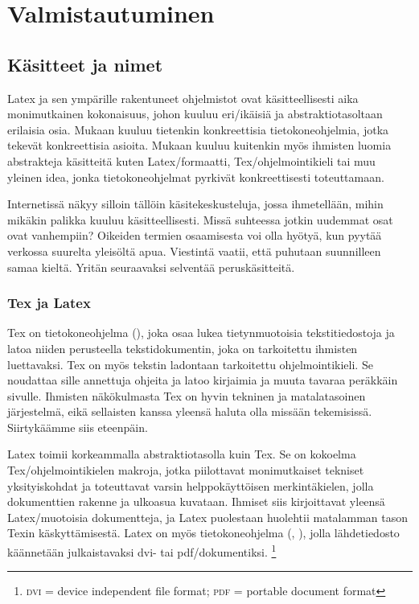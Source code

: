 \chapter{Valmistautuminen}

\section{Käsitteet ja nimet}

Latex ja sen ympärille rakentuneet ohjelmistot ovat käsitteellisesti
aika monimutkainen kokonaisuus, johon kuuluu eri\-/ikäisiä ja
abstraktiotasoltaan erilaisia osia. Mukaan kuuluu tietenkin
konkreettisia tietokoneohjelmia, jotka tekevät konkreettisia asioita.
Mukaan kuuluu kuitenkin myös ihmisten luomia abstrakteja käsitteitä
kuten Latex\-/formaatti, Tex\-/ohjelmointikieli tai muu yleinen idea,
jonka tietokoneohjelmat pyrkivät konkreettisesti toteuttamaan.

Internetissä näkyy silloin tällöin käsitekeskusteluja, jossa
ihmetellään, mihin mikäkin palikka kuuluu käsitteellisesti. Missä
suhteessa jotkin uudemmat osat ovat vanhempiin? Oikeiden termien
osaamisesta voi olla hyötyä, kun pyytää verkossa suurelta yleisöltä
apua. Viestintä vaatii, että puhutaan suunnilleen samaa kieltä. Yritän
seuraavaksi selventää peruskäsitteitä.

\subsection{Tex ja Latex}

Tex on tietokoneohjelma (), joka osaa lukea tietynmuotoisia
tekstitiedostoja ja latoa niiden perusteella tekstidokumentin, joka on
tarkoitettu ihmisten luettavaksi. Tex on myös tekstin ladontaan
tarkoitettu ohjelmointikieli. Se noudattaa sille annettuja ohjeita ja
latoo kirjaimia ja muuta tavaraa peräkkäin sivulle. Ihmisten
näkökulmasta Tex on hyvin tekninen ja matalatasoinen järjestelmä, eikä
sellaisten kanssa yleensä haluta olla missään tekemisissä. Siirtykäämme
siis eteenpäin.

Latex toimii korkeammalla abstraktiotasolla kuin Tex. Se on kokoelma
Tex\-/ohjelmointikielen makroja, jotka piilottavat monimutkaiset
tekniset yksityiskohdat ja toteuttavat varsin helppokäyttöisen
merkintäkielen, jolla dokumenttien rakenne ja ulko\-asua kuvataan.
Ihmiset siis kirjoittavat yleensä Latex\-/muotoisia dokumentteja, ja
Latex puolestaan huolehtii matalamman tason Texin käskyttämisestä. Latex
on myös tietokoneohjelma (, ), jolla
lähdetiedosto käännetään julkaistavaksi dvi- tai pdf\-/dokumentiksi.%
\footnote{\textsc{dvi} = device independent file format; \textsc{pdf} =
  portable document format}

